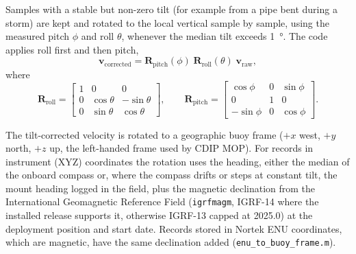 Samples with a stable but non-zero tilt (for example from a pipe bent during a
storm) are kept and rotated to the local vertical sample by sample, using the
measured pitch $\phi$ and roll $\theta$, whenever the median tilt exceeds
\SI{1}{\degree}. The code applies roll first and then pitch,
%
\begin{equation}
  \mathbf{v}_\text{corrected} =
  \mathbf{R}_\text{pitch}(\phi)\;\mathbf{R}_\text{roll}(\theta)\;
  \mathbf{v}_\text{raw},
  \label{eq:tilt}
\end{equation}
%
where
\[
  \mathbf{R}_\text{roll} = \begin{bmatrix}
    1 & 0 & 0 \\
    0 & \cos\theta & -\sin\theta \\
    0 & \sin\theta &  \cos\theta
  \end{bmatrix}, \qquad
  \mathbf{R}_\text{pitch} = \begin{bmatrix}
    \cos\phi & 0 & \sin\phi \\
    0 & 1 & 0 \\
    -\sin\phi & 0 & \cos\phi
  \end{bmatrix}.
\]


The tilt-corrected velocity is rotated to a geographic buoy frame ($+x$ west,
$+y$ north, $+z$ up, the left-handed frame used by CDIP MOP). For records in
instrument (XYZ) coordinates the rotation uses the heading, either the median of
the onboard compass or, where the compass drifts or steps at constant tilt, the
mount heading logged in the field, plus the magnetic declination from the
International Geomagnetic Reference Field (\texttt{igrfmagm}, IGRF-14 where the
installed release supports it, otherwise IGRF-13 capped at 2025.0) at the
deployment position and start date. Records stored in Nortek ENU coordinates,
which are magnetic, have the same declination added
(\texttt{enu\_to\_buoy\_frame.m}).


